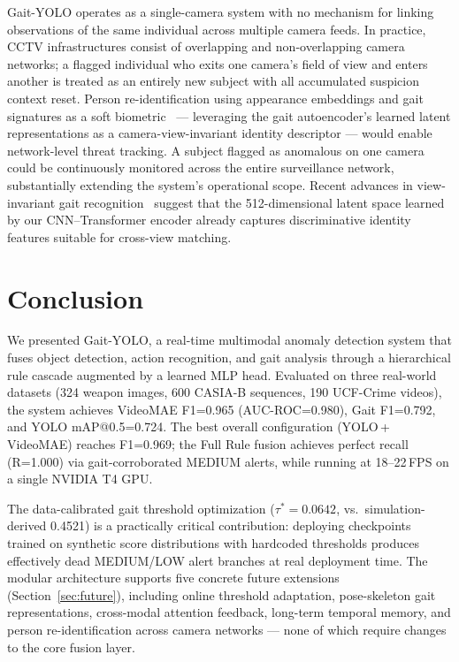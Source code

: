 \documentclass[conference]{IEEEtran}
\begin{document}
Gait-YOLO operates as a single-camera system with no mechanism for
linking observations of the same individual across multiple camera
feeds.  In practice, CCTV infrastructures consist of overlapping and
non-overlapping camera networks; a flagged individual who exits one
camera's field of view and enters another is treated as an entirely
new subject with all accumulated suspicion context reset.
Person re-identification using appearance embeddings and gait
signatures as a soft biometric~\cite{ye2021deep} --- leveraging the
gait autoencoder's learned latent representations as a
camera-view-invariant identity descriptor --- would enable
network-level threat tracking.  A subject flagged as anomalous on
one camera could be continuously monitored across the entire
surveillance network, substantially extending the system's
operational scope.  Recent advances in view-invariant gait
recognition~\cite{chao2019gaitset} suggest that the 512-dimensional
latent space learned by our CNN--Transformer encoder already captures
discriminative identity features suitable for cross-view matching.


\section{Conclusion}\label{sec:conc}

We presented Gait-YOLO, a real-time multimodal anomaly detection system
that fuses object detection, action recognition, and gait analysis through
a hierarchical rule cascade augmented by a learned MLP head.
Evaluated on three real-world datasets (324 weapon images, 600 CASIA-B
sequences, 190 UCF-Crime videos), the system achieves VideoMAE F1=0.965
(AUC-ROC=0.980), Gait F1=0.792, and YOLO mAP@0.5=0.724.
The best overall configuration (YOLO\,+\,VideoMAE) reaches F1=0.969;
the Full Rule fusion achieves perfect recall (R=1.000) via gait-corroborated
MEDIUM alerts, while running at 18--22\,FPS on a single NVIDIA T4 GPU.

The data-calibrated gait threshold optimization ($\tau^*=0.0642$, vs.\
simulation-derived 0.4521) is a practically critical contribution:
deploying checkpoints trained on synthetic score distributions with
hardcoded thresholds produces effectively dead MEDIUM/LOW alert branches
at real deployment time.
The modular architecture supports five concrete future extensions
(Section~\ref{sec:future}), including online threshold adaptation,
pose-skeleton gait representations, cross-modal attention feedback,
long-term temporal memory, and person re-identification across camera
networks --- none of which require changes to the core fusion layer.
\end{document}
